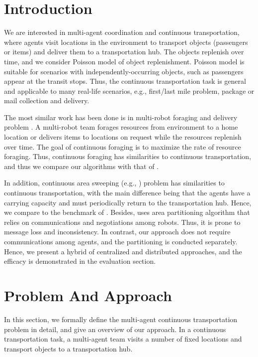 \documentclass{aamas2016_extendedabstract}
\begin{document}



\section{Introduction}
We are interested in multi-agent coordination and continuous transportation, where agents visit locations in the
environment to transport objects (passengers or items) and deliver them to a transportation hub. The objects
replenish over time, and we consider Poisson model of object replenishment. Poisson model is suitable for scenarios with
independently-occurring objects, such as passengers appear at the transit stops. Thus, the continuous
transportation task is general and applicable to many real-life scenarios, e.g., first/last mile problem, package or mail
collection and delivery.

The most similar work has been done is in multi-robot foraging and delivery problem \cite{liemhetcharat2015continuous,liemhetcharat2015multi}.
A multi-robot team forages resources from environment to a home location or delivers items to locations on request while the resources replenish over time.
The goal of continuous foraging is to
maximize the rate of resource foraging. Thus, continuous foraging has similarities to continuous transportation, and thus we
compare our algorithms with that of \cite{liemhetcharat2015continuous, liemhetcharat2015multi}.

In addition, continuous area sweeping (e.g., \cite{ahmadi2006multi}) problem has similarities to continuous transportation, with the
main difference being that the agents have a carrying capacity and must periodically return to the transportation hub.
Hence, we compare to the benchmark of \cite{ahmadi2006multi}. Besides, \cite{ahmadi2006multi} uses area partitioning algorithm that relies on
communications and negotiations among robots. Thus, it is prone to message loss and inconsistency. In contrast, our approach
does not require communications among agents, and the partitioning is conducted separately. Hence, we present
a hybrid of centralized and distributed approaches, and the efficacy is demonstrated in the evaluation section.

\section{Problem And Approach}
In this section, we formally define the multi-agent continuous transportation problem in detail, and give
an overview of our approach. In a continuous transportation task, a multi-agent team visits a number of fixed locations and transport objects
to a transportation hub.
\end{document}
